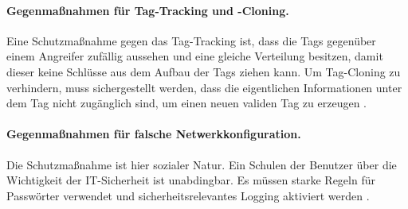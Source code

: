 \paragraph{Gegenmaßnahmen für Tag-Tracking und -Cloning.}
Eine Schutzmaßnahme gegen das Tag-Tracking ist, dass die Tags gegenüber einem
Angreifer zufällig aussehen und eine gleiche Verteilung besitzen, damit dieser
keine Schlüsse aus dem Aufbau der Tags ziehen kann. Um Tag-Cloning zu
verhindern, muss sichergestellt werden, dass die eigentlichen Informationen
unter dem Tag nicht zugänglich sind, um einen neuen validen Tag zu erzeugen
\cite{paper}.

\paragraph{Gegenmaßnahmen für falsche Netwerkkonfiguration.}
Die Schutzmaßnahme ist hier sozialer Natur. Ein Schulen der Benutzer über die
Wichtigkeit der IT-Sicherheit ist unabdingbar. Es müssen starke Regeln für
Passwörter verwendet und sicherheitsrelevantes Logging aktiviert werden
\cite{paper}.
